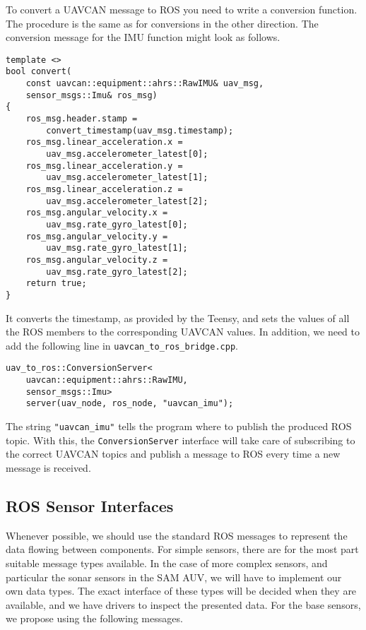 \documentclass[9pt,technote]{IEEEtran} %
\begin{document}
To convert a UAVCAN message to ROS you need to write a conversion
function. The procedure is the same as for conversions in the
other direction. The conversion message for the IMU function
might look as follows.
\begin{scriptsize}
\begin{verbatim}
template <>
bool convert(
    const uavcan::equipment::ahrs::RawIMU& uav_msg,
    sensor_msgs::Imu& ros_msg)
{
    ros_msg.header.stamp =
        convert_timestamp(uav_msg.timestamp);
    ros_msg.linear_acceleration.x =
        uav_msg.accelerometer_latest[0];
    ros_msg.linear_acceleration.y =
        uav_msg.accelerometer_latest[1];
    ros_msg.linear_acceleration.z =
        uav_msg.accelerometer_latest[2];
    ros_msg.angular_velocity.x =
        uav_msg.rate_gyro_latest[0];
    ros_msg.angular_velocity.y =
        uav_msg.rate_gyro_latest[1];
    ros_msg.angular_velocity.z =
        uav_msg.rate_gyro_latest[2];
    return true;
}
\end{verbatim}
\end{scriptsize}
It converts the timestamp, as provided by the Teensy,
and sets the values of all the ROS members to the corresponding
UAVCAN values. In addition, we need to add the following
line in \texttt{uavcan\_to\_ros\_bridge.cpp}.
\begin{scriptsize}
\begin{verbatim}
uav_to_ros::ConversionServer<
    uavcan::equipment::ahrs::RawIMU,
    sensor_msgs::Imu>
    server(uav_node, ros_node, "uavcan_imu");
\end{verbatim}
\end{scriptsize}
The string \texttt{"uavcan\_imu"} tells the program where to
publish the produced ROS topic. With this, the \texttt{ConversionServer}
interface will take care of subscribing to the correct UAVCAN topics
and publish a message to ROS every time a new message is received.

\subsection{ROS Sensor Interfaces}
\label{sensors}

Whenever possible, we should use the standard ROS messages
to represent the data flowing between components.
For simple sensors, there are for the most part suitable
message types available. In the case of more complex sensors,
and particular the sonar sensors in the SAM AUV, we will
have to implement our own data types. The exact interface
of these types will be decided when they are available, and
we have drivers to inspect the presented data.
For the base sensors, we propose using the following messages.
\end{document}
